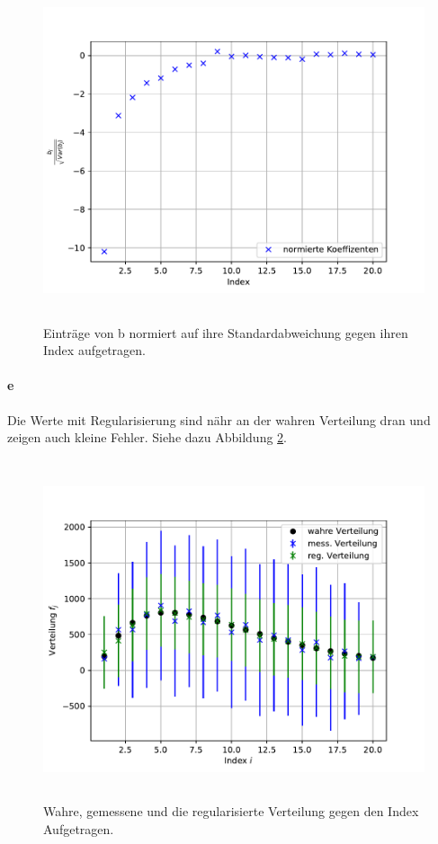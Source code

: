 \begin{figure}
  \centering
  \includegraphics[height = 10cm]{plots/bjggIndexplot.pdf}
  \caption{Einträge von b normiert auf ihre Standardabweichung gegen ihren Index aufgetragen.}
  \label{fig:bjplot}
\end{figure}

\paragraph{e}
Die Werte mit Regularisierung sind nähr an der wahren Verteilung dran und zeigen auch kleine Fehler. 
Siehe dazu Abbildung \ref{fig:rplot}. 
\begin{figure}
  \centering
  \includegraphics[height = 10cm]{plots/regplot.pdf}
  \caption{Wahre, gemessene und die regularisierte Verteilung gegen den Index Aufgetragen.}
  \label{fig:rplot}
\end{figure}
\FloatBarrier


